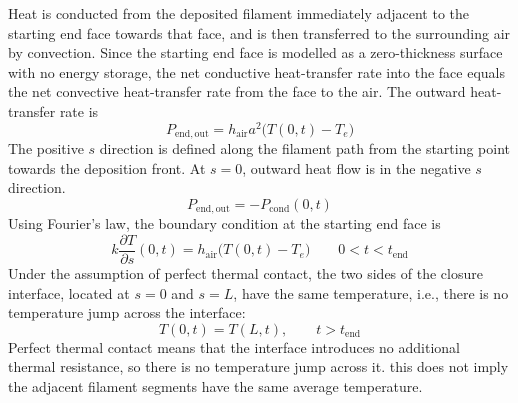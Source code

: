 \documentclass{article}
\begin{document}
Heat is conducted from the deposited filament immediately adjacent to the starting end face towards that face, and is then transferred to the surrounding air by convection. Since the starting end face is modelled as a zero-thickness surface with no energy storage, the net conductive heat-transfer rate into the face equals the net convective heat-transfer rate from the face to the air. 
The outward heat-transfer rate is 
\begin{equation}
P_{\mathrm{end,out}}=
h_{\mathrm{air}} a^2 \bigl(T(0,t)-T_e\bigr)
\end{equation}
The positive $s$ direction is defined along the filament path from the starting point towards the deposition front. At $s=0$, outward heat flow is in the negative $s$ direction.
\begin{equation}
P_{\mathrm{end,out}}=-P_{\mathrm{cond}}(0,t)
\end{equation}
Using Fourier's law, the boundary condition at the starting end face is
\begin{equation}
k \frac{\partial T}{\partial s}(0,t)
=h_{\mathrm{air}} \bigl(T(0,t)-T_e\bigr)
\qquad
0<t<t_{\mathrm{end}}
\end{equation}
Under the assumption of perfect thermal contact, the two sides of the closure interface, located at $s=0$ and $s=L$, have the same temperature, i.e., there is no temperature jump across the interface:
\begin{equation}
T(0,t)=T(L,t),
\qquad t>t_{\mathrm{end}}
\end{equation}
Perfect thermal contact means that the interface introduces no additional thermal resistance, so there is no temperature jump across it. this does not imply the adjacent filament segments have the same average temperature.
\end{document}
